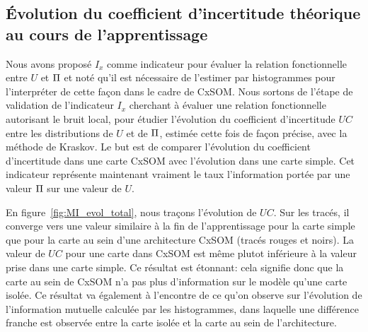 \documentclass[../main]{subfiles}
\begin{document}
\subsection{\'Evolution du coefficient d'incertitude théorique au cours de l'apprentissage}

Nous avons proposé $I_x$ comme indicateur pour évaluer la relation fonctionnelle entre $U$ et $\Pi$ et noté qu'il est nécessaire de l'estimer par histogrammes pour l'interpréter de cette façon dans le cadre de CxSOM.
Nous sortons de l'étape de validation de l'indicateur $I_x$ cherchant à évaluer une relation fonctionnelle autorisant le bruit local, pour étudier l'évolution du coefficient d'incertitude $UC$ entre les distributions de $U$ et de $\Pi$, estimée cette fois de façon précise, avec la méthode de Kraskov.
Le but est de comparer l'évolution du coefficient d'incertitude dans une carte CxSOM avec l'évolution dans une carte simple. Cet indicateur représente maintenant vraiment le taux l'information portée par une valeur $\Pi$ sur une valeur de $U$.

En figure~\ref{fig:MI_evol_total}, nous traçons l'évolution de $UC$.
Sur les tracés, il converge vers une valeur similaire à la fin de l'apprentissage pour la carte simple que pour la carte au sein d'une architecture CxSOM (tracés rouges et noirs). La valeur de $UC$ pour une carte dans CxSOM est même plutot inférieure à la valeur prise dans une carte simple.
Ce résultat est étonnant: cela signifie donc que la carte au sein de CxSOM n'a pas plus d'information sur le modèle qu'une carte isolée. Ce résultat va également à l'encontre de ce qu'on observe sur l'évolution de l'information mutuelle calculée par les histogrammes, dans laquelle une différence franche est observée entre la carte isolée et la carte au sein de l'architecture.
\end{document}
